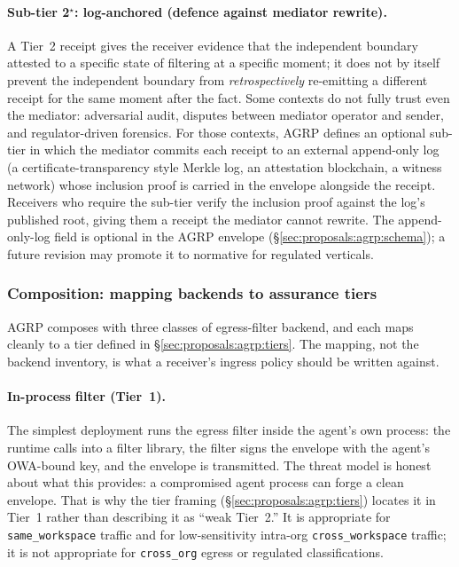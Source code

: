 \paragraph{Sub-tier 2$^\star$: log-anchored (defence against mediator rewrite).}
A Tier~2 receipt gives the receiver evidence that the
independent boundary attested to a specific state of
filtering at a specific moment; it does not by itself
prevent the independent boundary from
\emph{retrospectively} re-emitting a different receipt
for the same moment after the fact. Some contexts do not
fully trust even the mediator: adversarial
audit, disputes between mediator operator and sender,
and regulator-driven forensics. For those contexts, AGRP
defines an optional
sub-tier in which the mediator commits each receipt to
an external append-only log (a certificate-transparency
style Merkle log, an attestation blockchain, a witness
network) whose inclusion proof is carried in the
envelope alongside the receipt. Receivers who require
the sub-tier verify the inclusion proof against the
log's published root, giving them a receipt the
mediator cannot rewrite. The append-only-log field is
optional in the AGRP envelope
(\S\ref{sec:proposals:agrp:schema}); a future revision
may promote it to normative for regulated verticals.

\subsubsection{Composition: mapping backends to assurance tiers}
\label{sec:proposals:agrp:composition}

AGRP composes with three classes of egress-filter
backend, and each maps cleanly to a tier defined in
\S\ref{sec:proposals:agrp:tiers}. The mapping, not the
backend inventory, is what a receiver's ingress policy
should be written against.

\paragraph{In-process filter (Tier~1).}
The simplest deployment runs the egress filter inside
the agent's own process: the runtime calls into a
filter library, the filter signs the envelope with the
agent's OWA-bound key, and the envelope is
transmitted. The threat model is honest about what
this provides: a compromised agent process can
forge a clean envelope. That is why the tier
framing (\S\ref{sec:proposals:agrp:tiers}) locates it
in Tier~1 rather than describing it as ``weak Tier~2.''
It is appropriate for \texttt{same\_workspace} traffic
and for low-sensitivity intra-org \texttt{cross\_workspace}
traffic; it is not appropriate for \texttt{cross\_org}
egress or regulated classifications.

